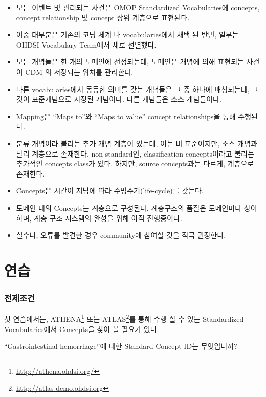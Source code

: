 \documentclass[11pt]{book}
\providecommand{\tightlist}{%
  \setlength{\itemsep}{0pt}\setlength{\parskip}{0pt}}
\let\rmarkdownfootnote\footnote%
\def\footnote{\protect\rmarkdownfootnote}
\theoremstyle{definition}
\theoremstyle{definition}
\theoremstyle{definition}
\theoremstyle{remark}
\let\BeginKnitrBlock\begin \let\EndKnitrBlock\end
\begin{document}
\BeginKnitrBlock{rmdsummary}
\begin{itemize}
\tightlist
\item
  모든 이벤트 및 관리되는 사건은 OMOP Standardized Vocabularies에
  concepts, concept relationship 및 concept 상위 계층으로 표현된다.
\item
  이중 대부분은 기존의 코딩 체계 나 vocabularies에서 채택 된 반면,
  일부는 OHDSI Vocabulary Team에서 새로 선별했다.
\item
  모든 개념들은 한 개의 도메인에 선정되는데, 도메인은 개념에 의해
  표현되는 사건이 CDM 의 저장되는 위치를 관리한다.
\item
  다른 vocabularies에서 동등한 의미를 갖는 개념들은 그 중 하나에
  매칭되는데, 그것이 표준개념으로 지정된 개념이다. 다른 개념들은 소스
  개념들이다.
\item
  Mapping은 ``Maps to''와 ``Maps to value'' concept relationships을 통해
  수행된다.
\item
  분류 개념이라 불리는 추가 개념 계층이 있는데, 이는 비 표준이지만, 소스
  개념과 달리 계층으로 존재한다. non-standard인, classification
  concepts이라고 불리는 추가적인 concepts class가 있다. 하지만, source
  concepts과는 다르게, 계층으로 존재한다.
\item
  Concepts은 시간이 지남에 따라 수명주기(life-cycle)를 갖는다.
\item
  도메인 내의 Concepts는 계층으로 구성된다. 계층구조의 품질은 도메인마다
  상이하며, 계층 구조 시스템의 완성을 위해 아직 진행중이다.\\
\item
  실수나, 오류를 발견한 경우 community에 참여할 것을 적극 권장한다.
\end{itemize}
\EndKnitrBlock{rmdsummary}

\section{연습}

\subsubsection*{전제조건}

첫 연습에서는, ATHENA\footnote{\url{http://athena.ohdsi.org/}} 또는
ATLAS\footnote{\url{http://atlas-demo.ohdsi.org}}를 통해 수행 할 수 있는
Standardized Vocabularies에서 Concepts을 찾아 볼 필요가 있다.

\BeginKnitrBlock{exercise}
\protect\hypertarget{exr:exerciseVocab1}{}{\label{exr:exerciseVocab1}
}``Gastrointestinal hemorrhage''에 대한 Standard Concept ID는
무엇입니까?
\EndKnitrBlock{exercise}
\end{document}
